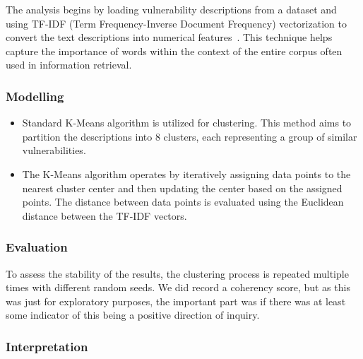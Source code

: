 The analysis begins by loading vulnerability descriptions from a dataset and using TF-IDF (Term Frequency-Inverse Document Frequency) vectorization to convert the text descriptions into numerical features~\cite{tfidf}. This technique helps capture the importance of words within the context of the entire corpus often used in information retrieval.

\subsubsection{Modelling}

\begin{itemize}

	\item Standard K-Means algorithm is utilized for clustering. This method aims to partition the descriptions into 8 clusters, each representing a group of similar vulnerabilities.
	\item The K-Means algorithm operates by iteratively assigning data points to the nearest cluster center and then updating the center based on the assigned points. The distance between data points is evaluated using the Euclidean distance between the TF-IDF vectors.
\end{itemize}

\subsubsection{Evaluation}


To assess the stability of the results, the clustering process is repeated multiple times with different random seeds. We did record a coherency score, but as this was just for exploratory purposes, the important part was if there was at least some indicator of this being a positive direction of inquiry.

\subsubsection{Interpretation}

